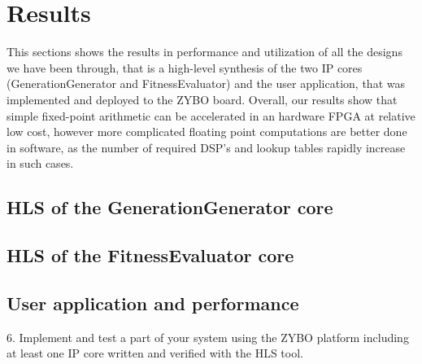 \section{Results}

This sections shows the results in performance and utilization of all the designs we have been through, that is a high-level synthesis of the two IP cores (GenerationGenerator and FitnessEvaluator) and the user application, that was implemented and deployed to the ZYBO board. Overall, our results show that simple fixed-point arithmetic can be accelerated in an hardware FPGA at relative low cost, however more complicated floating point computations are better done in software, as the number of required DSP's and lookup tables rapidly increase in such cases.

\subsection{HLS of the GenerationGenerator core}
\subsection{HLS of the FitnessEvaluator core}
\subsection{User application and performance}

\begin{framed}
6. Implement and test a part of your system using the ZYBO platform including at least one IP core written and verified with the HLS tool.
\end{framed}


